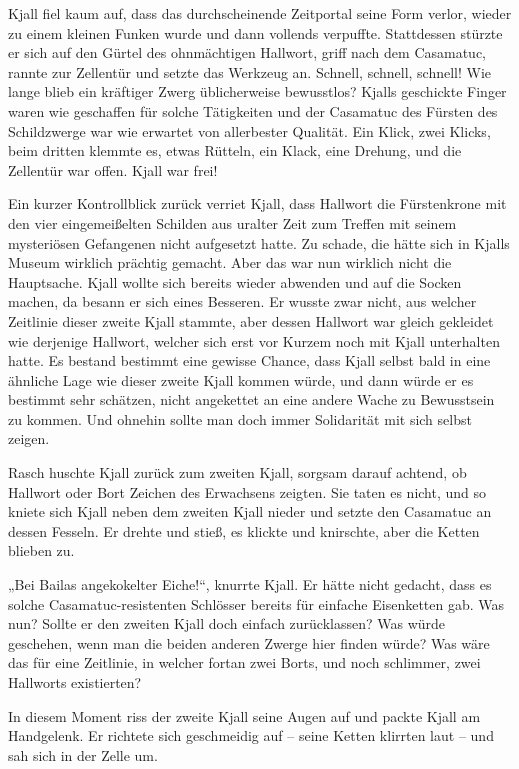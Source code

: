 \documentclass[10pt, a4paper, oneside]{book}
\begin{document}
Kjall fiel kaum auf, dass das durchscheinende Zeitportal seine Form verlor, wieder zu einem kleinen Funken wurde und dann vollends verpuffte. Stattdessen stürzte er sich auf den Gürtel des ohnmächtigen Hallwort, griff nach dem Casamatuc, rannte zur Zellentür und setzte das Werkzeug an. Schnell, schnell, schnell! Wie lange blieb ein kräftiger Zwerg üblicherweise bewusstlos? Kjalls geschickte Finger waren wie geschaffen für solche Tätigkeiten und der Casamatuc des Fürsten des Schildzwerge war wie erwartet von allerbester Qualität. Ein Klick, zwei Klicks, beim dritten klemmte es, etwas Rütteln, ein Klack, eine Drehung, und die Zellentür war offen. Kjall war frei!

Ein kurzer Kontrollblick zurück verriet Kjall, dass Hallwort die Fürstenkrone mit den vier eingemeißelten Schilden aus uralter Zeit zum Treffen mit seinem mysteriösen Gefangenen nicht aufgesetzt hatte. Zu schade, die hätte sich in Kjalls Museum wirklich prächtig gemacht. Aber das war nun wirklich nicht die Hauptsache. Kjall wollte sich bereits wieder abwenden und auf die Socken machen, da besann er sich eines Besseren. Er wusste zwar nicht, aus welcher Zeitlinie dieser zweite Kjall stammte, aber dessen Hallwort war gleich gekleidet wie derjenige Hallwort, welcher sich erst vor Kurzem noch mit Kjall unterhalten hatte. Es bestand bestimmt eine gewisse Chance, dass Kjall selbst bald in eine ähnliche Lage wie dieser zweite Kjall kommen würde, und dann würde er es bestimmt sehr schätzen, nicht angekettet an eine andere Wache zu Bewusstsein zu kommen. Und ohnehin sollte man doch immer Solidarität mit sich selbst zeigen.

Rasch huschte Kjall zurück zum zweiten Kjall, sorgsam darauf achtend, ob Hallwort oder Bort Zeichen des Erwachsens zeigten. Sie taten es nicht, und so kniete sich Kjall neben dem zweiten Kjall nieder und setzte den Casamatuc an dessen Fesseln. Er drehte und stieß, es klickte und knirschte, aber die Ketten blieben zu.

„Bei Bailas angekokelter Eiche!“, knurrte Kjall. Er hätte nicht gedacht, dass es solche Casamatuc-resistenten Schlösser bereits für einfache Eisenketten gab. Was nun? Sollte er den zweiten Kjall doch einfach zurücklassen? Was würde geschehen, wenn man die beiden anderen Zwerge hier finden würde? Was wäre das für eine Zeitlinie, in welcher fortan zwei Borts, und noch schlimmer, zwei Hallworts existierten?

In diesem Moment riss der zweite Kjall seine Augen auf und packte Kjall am Handgelenk. Er richtete sich geschmeidig auf – seine Ketten klirrten laut – und sah sich in der Zelle um.
\end{document}
